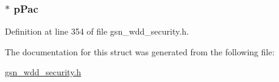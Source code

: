 \hypertarget{a00288_a1243a664ca4dd595185078f334740042}{
\subsubsection[{pPac}]{$\ast$ {\bf pPac}}}
\label{a00288_a1243a664ca4dd595185078f334740042}


Definition at line 354 of file gsn\_\-wdd\_\-security.h.



The documentation for this struct was generated from the following file:\begin{DoxyCompactItemize}
\item 
\hyperlink{a00604}{gsn\_\-wdd\_\-security.h}\end{DoxyCompactItemize}

